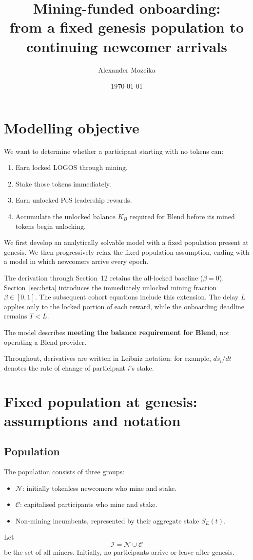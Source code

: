 \documentclass[11pt,a4paper]{article}
\title{Mining-funded onboarding:\\from a fixed genesis population to continuing newcomer arrivals}
\author{Alexander Mozeika}
\date{\today}
\begin{document}
\maketitle

\tableofcontents
\section{Modelling objective}
We want to determine whether a participant starting with no tokens can:
\begin{enumerate}
\item Earn locked LOGOS through mining.
\item Stake those tokens immediately.
\item Earn unlocked PoS leadership rewards.
\item Accumulate the unlocked balance $K_B$ required for Blend before its mined tokens begin unlocking.
\end{enumerate}
We first develop an analytically solvable model with a fixed population present at genesis. We then progressively relax the fixed-population assumption, ending with a model in which newcomers arrive every epoch.

The derivation through Section~12 retains the all-locked baseline ($\beta=0$). Section~\ref{sec:beta} introduces the immediately unlocked mining fraction $\beta\in[0,1]$. The subsequent cohort equations include this extension. The delay $L$ applies only to the locked portion of each reward, while the onboarding deadline remains $T<L$.

The model describes \textbf{meeting the balance requirement for Blend}, not operating a Blend provider.

Throughout, derivatives are written in Leibniz notation: for example, $ds_i/dt$ denotes the rate of change of participant $i$'s stake.

\section{Fixed population at genesis: assumptions and notation}
\subsection{Population}
The population consists of three groups:
\begin{itemize}
\item $\mathcal N$: initially tokenless newcomers who mine and stake.
\item $\mathcal C$: capitalised participants who mine and stake.
\item Non-mining incumbents, represented by their aggregate stake $S_E(t)$.
\end{itemize}
Let
\begin{equation}
\mathcal I=\mathcal N\cup\mathcal C
\end{equation}
be the set of all miners. Initially, no participants arrive or leave after genesis.
\end{document}
